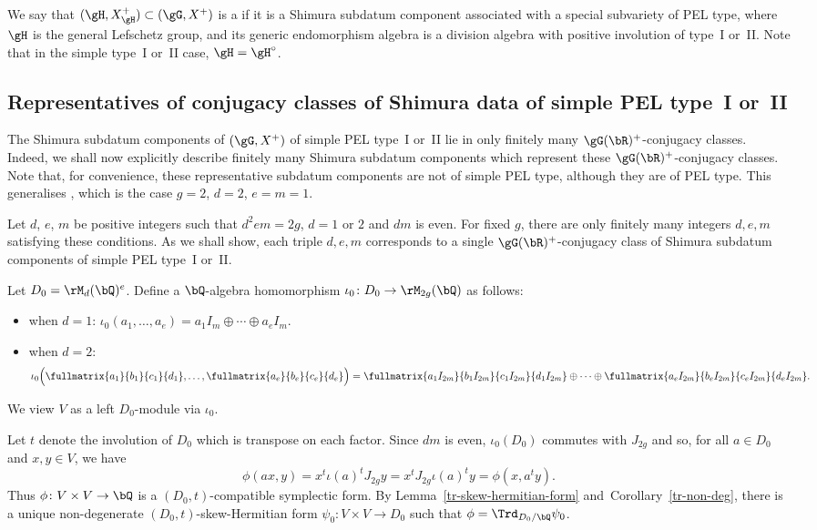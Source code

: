 We say that $(\gH, X_\gH^+) \subset (\gG, X^+)$ is a  if it is a Shimura subdatum component associated with a special subvariety of PEL type, where $\gH$ is the general Lefschetz group, and its generic endomorphism algebra is a division algebra with positive involution of type~I or~II.
Note that in the simple type~I or~II case, $\gH = \gH^\circ$.

\subsection{Representatives of conjugacy classes of Shimura data of simple PEL type~I or~II}
\label{subsec:shimura-representatives}

The Shimura subdatum components of $(\gG, X^+)$ of simple PEL type~I or~II lie in only finitely many $\gG(\bR)^+$-conjugacy classes.
Indeed, we shall now explicitly describe finitely many Shimura subdatum components which represent these $\gG(\bR)^+$-conjugacy classes.
Note that, for convenience, these representative subdatum components are not of simple PEL type, although they are of PEL type.
This generalises \cite[Lem.\,6.1]{QRTUI}, which is the case $g=2$, $d=2$, $e=m=1$.

Let $d$, $e$, $m$ be positive integers such that $d^2em = 2g$, $d=1$ or $2$ and $dm$ is even.
For fixed $g$, there are only finitely many integers $d,e,m$ satisfying these conditions.
As we shall show, each triple $d,e,m$ corresponds to a single $\gG(\bR)^+$-conjugacy class of Shimura subdatum components of simple PEL type~I or~II.

Let $D_0 = \rM_d(\bQ)^e$.
Define a $\bQ$-algebra homomorphism $\iota_0 \colon D_0 \to \rM_{2g}(\bQ)$ as follows:
\begin{itemize}
\item when $d=1$:
$\iota_0(a_1, \dotsc, a_e) = a_1 I_m \oplus \dotsb \oplus a_e I_m$.
\item when $d=2$:
\[
\iota_0\Bigl( \fullmatrix{a_1}{b_1}{c_1}{d_1}, \dotsc, \fullmatrix{a_e}{b_e}{c_e}{d_e} \Bigr)
= \fullmatrix{a_1I_{2m}}{b_1I_{2m}}{c_1I_{2m}}{d_1I_{2m}} \oplus \dotsb \oplus \fullmatrix{a_eI_{2m}}{b_eI_{2m}}{c_eI_{2m}}{d_eI_{2m}}.
\]
\end{itemize}
We view $V$ as a left $D_0$-module via $\iota_0$.

Let $t$ denote the involution of $D_0$ which is transpose on each factor.
Since $dm$ is even, $\iota_0(D_0)$ commutes with $J_{2g}$ and so, for all $a \in D_0$ and $x, y \in V$, we have
\[
\phi(ax, y) = x^t \iota(a)^t J_{2g} y = x^t J_{2g} \iota(a)^t y = \phi(x, a^t y).
\]
Thus $\phi \colon V \times V \to \bQ$ is a $(D_0,t)$-compatible symplectic form.
By Lemma~\ref{tr-skew-hermitian-form} and~Corolla\-ry~\ref{tr-non-deg}, there is a unique non-degenerate $(D_0,t)$-skew-Hermitian form $\psi_0 \colon V \times V \to D_0$ such that $\phi = \Trd_{D_0/\bQ} \psi_0$.

